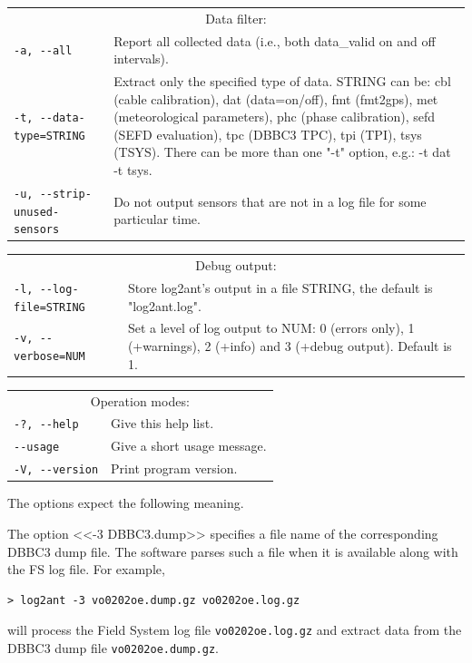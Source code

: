 \documentclass [10pt,letterpaper]{report}
\begin{document}
\begin{tabular}{p{\leftSp}p{\riteSp}}
\multicolumn{2}{c}{Data filter:}\\
{\tt -a, -{}-all}                  & Report all collected data (i.e., both data\_valid on and off intervals).\\
{\tt -t, -{}-data-type=STRING}     & Extract only the specified type of data. STRING can be: cbl (cable calibration), dat
(data=on/off), fmt (fmt2gps), met (meteorological parameters), phc (phase calibration), sefd (SEFD evaluation),
tpc (DBBC3 TPC), tpi (TPI), tsys (TSYS). There can be more than one "-t" option, e.g.: -t dat -t tsys.\\
{\tt -u, -{}-strip-unused-sensors} & Do not output sensors that are not in a log file for some particular time.\\
\end{tabular}
\vspace{5mm}

\begin{tabular}{p{\leftSp}p{\riteSp}}
\multicolumn{2}{c}{Debug output:}\\
{\tt -l, -{}-log-file=STRING}      & Store log2ant's output in a file STRING, the default is "log2ant.log".\\
{\tt -v, -{}-verbose=NUM}          & Set a level of log output to NUM: 0 (errors only), 1 (+warnings), 2 (+info) and 3 (+debug output). Default is 1.\\
\end{tabular}
\vspace{5mm}

\begin{tabular}{p{\leftSp}p{\riteSp}}
\multicolumn{2}{c}{Operation modes:}\\
{\tt -?, -{}-help   }              & Give this help list.\\
{\tt     -{}-usage  }              & Give a short usage message.\\
{\tt -V, -{}-version}              & Print program version.\\
\end{tabular}
\vspace{5mm}

\noindent
The options expect the following meaning.

The option <<-3 DBBC3.dump>> specifies a file name of the corresponding DBBC3 dump file.
The software parses such a file when it is available along with the FS log file. For
example,
\begin{verbatim}
> log2ant -3 vo0202oe.dump.gz vo0202oe.log.gz
\end{verbatim}
\noindent
will process the Field System log file {\tt vo0202oe.log.gz} and extract data from the DBBC3
dump file {\tt vo0202oe.dump.gz}.
\end{document}
